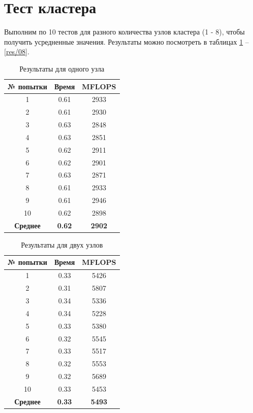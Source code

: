 \section{Тест кластера}
Выполним по 10 тестов для разного количества узлов кластера (1 - 8), чтобы получить усредненные значения. Результаты можно посмотреть в таблицах \ref{res/01} -- \ref{res/08}.

\begin{table}[H]
	\caption{Результаты для одного узла}
	\centering
	\begin{tabular}{|c|c|c|}
		\hline
\textbf{№ попытки} & \textbf{Время} & \textbf{MFLOPS} \\ \hline
		1  & 0.61 & 2933 \\ \hline
		2  & 0.61 & 2930 \\ \hline
		3  & 0.63 & 2848 \\ \hline
		4  & 0.63 & 2851 \\ \hline
		5  & 0.62 & 2911 \\ \hline
		6  & 0.62 & 2901 \\ \hline
		7  & 0.63 & 2871 \\ \hline
		8  & 0.61 & 2933 \\ \hline
		9  & 0.61 & 2946 \\ \hline
		10 & 0.62 & 2898 \\ \hline
\textbf{Среднее} & \textbf{0.62} & \textbf{2902} \\
		\hline
	\end{tabular}
	\label{res/01}
\end{table}


\begin{table}[H]
	\caption{Результаты для двух узлов}
	\centering
	\begin{tabular}{|c|c|c|}
		\hline
		\textbf{№ попытки} & \textbf{Время} & \textbf{MFLOPS} \\\hline
		1 & 0.33 & 5426 \\ \hline
		2 & 0.31 & 5807 \\ \hline
		3 & 0.34 & 5336 \\ \hline
		4 & 0.34 & 5228 \\ \hline
		5 & 0.33 & 5380 \\ \hline
		6 & 0.32 & 5545 \\ \hline
		7 & 0.33 & 5517 \\ \hline
		8 & 0.32 & 5553 \\ \hline
		9 & 0.32 & 5689 \\ \hline
		10 & 0.33 & 5453 \\ \hline
		\textbf{Среднее} & \textbf{0.33} & \textbf{5493} \\\hline
	\end{tabular}
	\label{res/02}
\end{table}


